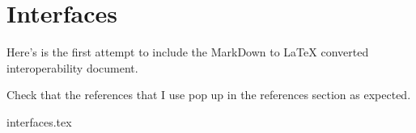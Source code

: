 % 

\chapter{Interfaces}
Here's is the first attempt to include the MarkDown to LaTeX converted interoperability document.

Check that the references \cite{IDL4} that I use pop up in the references section as expected.

{interfaces.tex}
